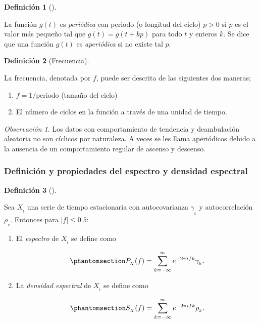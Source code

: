 \documentclass[
  us-letterpaper,
]{scrreprt}
\theoremstyle{definition}
\theoremstyle{plain}
\theoremstyle{plain}
\theoremstyle{definition}
\newtheorem{definition}{Definición}[chapter]
\theoremstyle{remark}
\newtheorem*{remark}{Observación}
\begin{document}
\begin{definition}[]\protect\hypertarget{def-aper}{}\label{def-aper}

La función \(g(t)\) es \emph{periódica} con periodo (o longitud del
ciclo) \(p > 0\) si \(p\) es el valor más pequeño tal que
\(g(t) = g(t + kp)\) para todo \(t\) y enteros \(k\). Se dice que una
función \(g(t)\) es \emph{aperiódica} si no existe tal \(p\).

\end{definition}

\begin{definition}[Frecuencia]\protect\hypertarget{def-freq}{}\label{def-freq}

La frecuencia, denotada por \(f\), puede ser descrita de las siguientes
dos maneras;

\begin{enumerate}
\def\labelenumi{\arabic{enumi}.}
\item
  \(f=1/\text{periodo}\) (tamaño del ciclo)
\item
  El número de ciclos en la función a través de una unidad de tiempo.
\end{enumerate}

\end{definition}

\begin{remark}
Los datos con comportamiento de tendencia y deambulación aleatoria no
son cíclicos por naturaleza. A veces se les llama aperiódicos debido a
la ausencia de un comportamiento regular de ascenso y descenso.
\end{remark}

\subsubsection{Definición y propiedades del espectro y densidad
espectral}\label{definiciuxf3n-y-propiedades-del-espectro-y-densidad-espectral}

\begin{definition}[]\protect\hypertarget{def-spec}{}\label{def-spec}

Sea \(X_{_t}\) una serie de tiempo estacionaria con autocovarianza
\(\gamma_{_k}\) y autocorrelación \(\rho_{_k}\). Entonces para
\(|f|\le 0.5\):

\begin{enumerate}
\def\labelenumi{\roman{enumi}.}
\item
  El \emph{espectro} de \(X_{_t}\) se define como

  \begin{equation}\phantomsection\label{eq-spectrum}{
  P_{_X}(f)=\sum_{k=-\infty}^\infty e^{-2\pi ifk}\gamma_{_k}.
  }\end{equation}
\item
  La \emph{densidad espectral} de \(X_{_t}\) se define como

  \begin{equation}\phantomsection\label{eq-spectden}{
  S_{_X}(f)=\sum_{k=-\infty}^\infty e^{-2\pi ifk}\rho_{_k}.
  }\end{equation}
\end{enumerate}

\end{definition}
\end{document}
